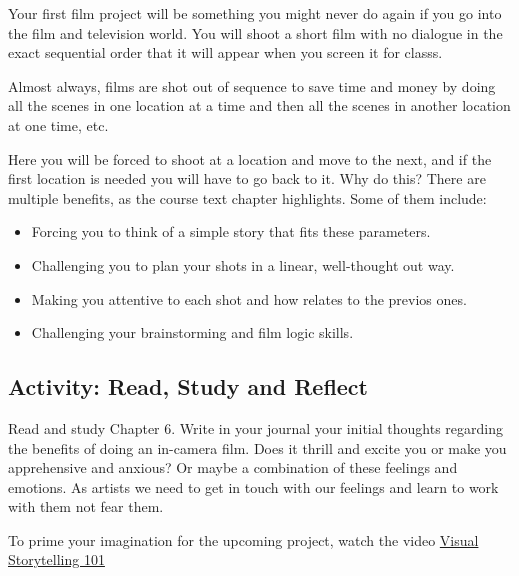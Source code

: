 \documentclass[
]{book}
\providecommand{\tightlist}{%
  \setlength{\itemsep}{0pt}\setlength{\parskip}{0pt}}
\begin{document}
Your first film project will be something you might never do again if you go into the film and television world. You will shoot a short film with no dialogue in the exact sequential order that it will appear when you screen it for classs.

Almost always, films are shot out of sequence to save time and money by doing all the scenes in one location at a time and then all the scenes in another location at one time, etc.

Here you will be forced to shoot at a location and move to the next, and if the first location is needed you will have to go back to it. Why do this? There are multiple benefits, as the course text chapter highlights. Some of them include:

\begin{itemize}
\tightlist
\item
  Forcing you to think of a simple story that fits these parameters.\\
\item
  Challenging you to plan your shots in a linear, well-thought out way.\\
\item
  Making you attentive to each shot and how relates to the previos ones.\\
\item
  Challenging your brainstorming and film logic skills.
\end{itemize}

\hypertarget{activity-read-study-and-reflect}{%
\subsection*{Activity: Read, Study and Reflect}\label{activity-read-study-and-reflect}}

\begin{reflect}
Read and study Chapter 6. Write in your journal your initial thoughts regarding the benefits of doing an in-camera film. Does it thrill and excite you or make you apprehensive and anxious? Or maybe a combination of these feelings and emotions. As artists we need to get in touch with our feelings and learn to work with them not fear them.

To prime your imagination for the upcoming project, watch the video \href{https://www.youtube.com/watch?v=iWQQgZh9EyE}{Visual Storytelling 101}
\end{reflect}
\end{document}
